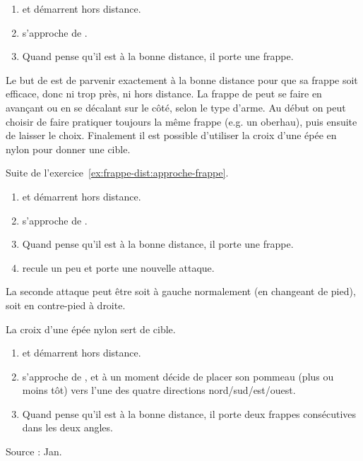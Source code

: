 \begin{exercice}
\label{ex:frappe-dist:approche-frappe}

\begin{enumerate}
	\item \A et \D démarrent hors distance.
	\item \D s'approche de \A.
	\item Quand \A pense qu'il est à la bonne distance, il porte une frappe.
\end{enumerate}

Le but de \A est de parvenir exactement à la bonne distance pour que sa frappe soit efficace, donc ni trop près, ni hors distance.
La frappe de \A peut se faire en avançant ou en se décalant sur le côté, selon le type d'arme.
Au début on peut choisir de faire pratiquer toujours la même frappe (e.g.
un oberhau), puis ensuite de laisser le choix.
Finalement il est possible d'utiliser la croix d'une épée en nylon pour donner une cible.

\end{exercice}


\begin{exercice}
\label{ex:frappe-dist:approche-double-frappe}

Suite de l'exercice~\ref{ex:frappe-dist:approche-frappe}.

\begin{enumerate}
	\item \A et \D démarrent hors distance.
	\item \D s'approche de \A.
	\item Quand \A pense qu'il est à la bonne distance, il porte une frappe.
	\item \D recule un peu et \A porte une nouvelle attaque.
\end{enumerate}

La seconde attaque peut être soit à gauche normalement (en changeant de pied), soit en contre-pied à droite.
\end{exercice}


\begin{exercice}
\label{ex:frappe-dist:approche-croix-aleat}

La croix d'une épée nylon sert de cible.

\begin{enumerate}
	\item \A et \D démarrent hors distance.
	\item \D s'approche de \A, et à un moment décide de placer son pommeau (plus ou moins tôt) vers l'une des quatre directions nord/sud/est/ouest.
	\item Quand \A pense qu'il est à la bonne distance, il porte deux frappes consécutives dans les deux angles.
\end{enumerate}

Source : Jan.

\end{exercice}


